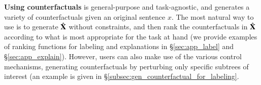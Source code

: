 

\textbf{Using counterfactuals}
\sysname is general-purpose and task-agnostic, and generates a variety of counterfactuals given an original sentence $x$. The most natural way to use \sysname is to generate $\hat{\mathbf{X}}$ without constraints, and then rank the counterfactuals in  $\hat{\mathbf{X}}$ according to what is most appropriate for the task at hand (we provide examples of ranking functions for labeling and explanations in  \S\ref{sec:app_label} and \S\ref{sec:app_explain}). However, users can also make use of the various control mechanisms, \eg generating counterfactuals by perturbing only specific subtrees of interest (an example is given in \S\ref{subsec:gen_counterfactual_for_labeling}.






